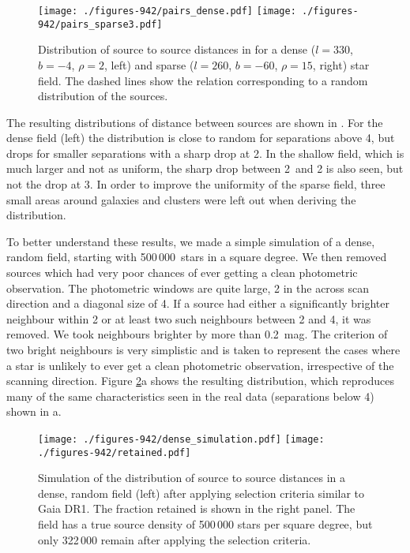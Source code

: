 \begin{figure}
\centering
\texttt{[image: ./figures-942/pairs\_dense.pdf]}
\texttt{[image: ./figures-942/pairs\_sparse3.pdf]}
\caption{Distribution of source to source distances in {} for a dense
($l=330$\deg, $b=-4$\deg, $\rho=2$\deg, left) 
and sparse ($l=260$\deg, $b=-60$\deg, $\rho=15$\deg, right) star field. 
The dashed lines show the
relation corresponding to a random distribution of the sources.
\label{fig:942_pairs}}
\end{figure}

The resulting distributions of distance between sources are shown in
. For the dense field (left) the distribution is
close to random for separations above 4\arcsec, but drops for smaller
separations with a sharp drop at 2\arcsec. In the shallow field, which is much 
larger and not as uniform, the sharp drop between 2\arcsec\ and 2 is also
seen, but not the drop at 3. In order to improve the uniformity of the sparse
field, three small areas around galaxies and clusters were left out when deriving 
the distribution.

To better understand these results, we made a simple simulation of a dense,
random field, starting with 500\,000~stars in a square degree. We then removed
sources which had very poor chances of ever getting a clean photometric
observation. The photometric windows are quite large, 2 in the across
scan direction and a diagonal size of 4. If a source had either a
significantly brighter neighbour within 2 or at least two such
neighbours between 2 and 4, it was removed. We took neighbours 
brighter by more than 0.2~mag. The criterion of two bright
neighbours is very simplistic and is taken to represent the cases where a star
is unlikely to ever get a clean photometric observation, irrespective of the
scanning direction.
Figure \ref{fig:942_simul}a shows the resulting distribution, which reproduces
many of the same characteristics seen in the real data (separations below 4\arcsec) shown in
a.

\begin{figure}
\centering
\texttt{[image: ./figures-942/dense\_simulation.pdf]}
\texttt{[image: ./figures-942/retained.pdf]}
\caption{Simulation of the distribution of source to source distances in 
a dense, random field (left) after applying selection criteria similar to
Gaia DR1. The fraction retained is shown in the right panel.
The field has a true source density of 500\,000 stars per square degree,
but only 322\,000 remain after applying the selection criteria.
\label{fig:942_simul}}
\end{figure}

